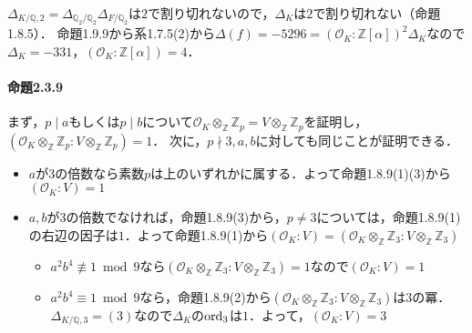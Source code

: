 $\varDelta_{K/\mathbb{Q}, 2}=\varDelta_{\mathbb{Q}_2/\mathbb{Q}_2}\varDelta_{F/\mathbb{Q}_2}$は$2$で割り切れないので，$\varDelta_{K}$は$2$で割り切れない（命題1.8.5）．
命題1.9.9から系1.7.5(2)から$\varDelta(f)=-5296=(\mathcal{O}_K:\mathbb{Z}[\alpha])^2\varDelta_K$なので$\varDelta_K=-331$，$(\mathcal{O}_K:\mathbb{Z}[\alpha])=4$．

\paragraph{命題2.3.9}
まず，$p\mid a$もしくは$p\mid b$について$\mathcal{O}_K\otimes_\mathbb{Z}\mathbb{Z}_p= V\otimes_\mathbb{Z}\mathbb{Z}_p$を証明し，$(\mathcal{O}_K\otimes_\mathbb{Z}\mathbb{Z}_p:V\otimes_\mathbb{Z}\mathbb{Z}_p)=1$．
次に，$p\nmid 3, a, b$に対しても同じことが証明できる．

\begin{itemize}
  \item $a$が$3$の倍数なら素数$p$は上のいずれかに属する．よって命題1.8.9(1)(3)から$(\mathcal{O}_K:V)=1$
  \item $a, b$が$3$の倍数でなければ，命題1.8.9(3)から，$p\neq3$については，命題1.8.9(1)の右辺の因子は$1$．よって命題1.8.9(1)から$(\mathcal{O}_K:V)=(\mathcal{O}_K\otimes_\mathbb{Z}\mathbb{Z}_3:V\otimes_\mathbb{Z}\mathbb{Z}_3)$
  \begin{itemize}[label=•]
    \item $a^2b^4\not\equiv1\bmod9$なら$(\mathcal{O}_K\otimes_\mathbb{Z}\mathbb{Z}_3:V\otimes_\mathbb{Z}\mathbb{Z}_3)=1$なので$(\mathcal{O}_K:V)=1$
    \item $a^2b^4\equiv1\bmod9$なら，命題1.8.9(2)から$(\mathcal{O}_K\otimes_\mathbb{Z}\mathbb{Z}_3:V\otimes_\mathbb{Z}\mathbb{Z}_3)$は$3$の冪．
    $\varDelta_{K/\mathbb{Q}, 3}=(3)$なので$\varDelta_K$の$\operatorname{ord}_3$は$1$．よって，$(\mathcal{O}_K:V)=3$
  \end{itemize}
\end{itemize}

